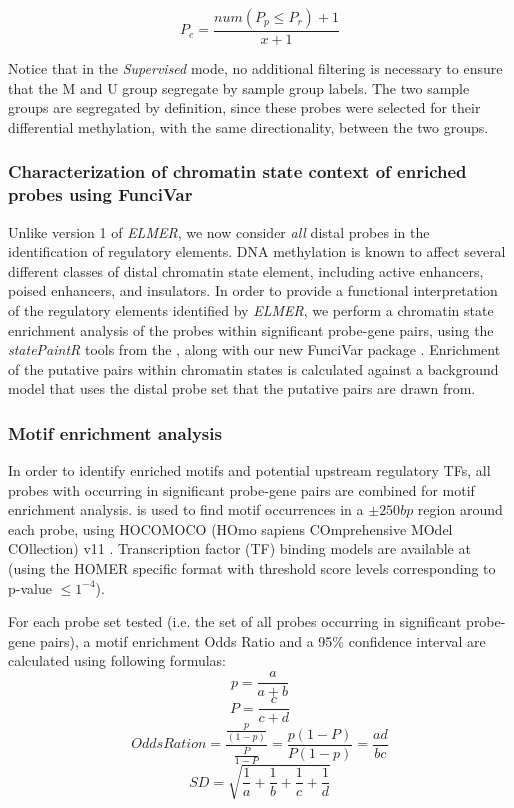 $$P_e = \frac{num(P_p \leq P_r)+ 1}{x+1}$$

Notice that in the \textit{Supervised} mode, no additional filtering is necessary to ensure that the M and U group segregate by sample group labels.  The two sample groups are segregated by definition, since these probes were selected for their differential methylation, with the same directionality, between the two groups. 



\subsubsection*{Characterization of chromatin state context of enriched probes using FunciVar}

Unlike version 1 of \textit{ELMER}, we now consider \textit{all} distal probes in the identification of regulatory elements. DNA methylation is known to affect several different classes of distal chromatin state element, including active enhancers, poised enhancers, and insulators. In order to provide a functional interpretation of the regulatory elements identified by \textit{ELMER}, we perform a chromatin state enrichment analysis of the probes within significant probe-gene pairs, using the \textit{statePaintR} tools from the  \cite{statepaintr}, along with our new FunciVar package \cite{funcivar}. Enrichment of the putative pairs within chromatin states is calculated against a background model that uses the distal probe set that the putative pairs are drawn from. 

\subsubsection*{Motif enrichment analysis}
In order to identify enriched motifs and potential upstream regulatory TFs, all probes with occurring in significant probe-gene pairs are combined for motif enrichment analysis.  \cite{heinz2010simple} is used to find motif occurrences in a $\pm 250bp$ region around each probe, using HOCOMOCO (HOmo sapiens COmprehensive MOdel COllection) v11 \cite{kulakovskiy2016hocomoco}. Transcription factor (TF) binding models are available at  (using the HOMER specific format with threshold score levels corresponding to p-value $ \leq 1^{-4}$). 

For each probe set tested (i.e. the set of all probes occurring in significant probe-gene pairs), a motif enrichment Odds Ratio and a 95\% confidence interval are calculated using following formulas:
$$p = \frac{a}{a + b}$$
$$P = \frac{c}{c + d}$$
$$Odds Ration = \frac{\frac{p}{(1-p)}}{\frac{P}{1-P}}= \frac{p(1-P)}{P(1-p)}=\frac{ad}{bc}$$
$$SD = \sqrt{\frac{1}{a} + \frac{1}{b} + \frac{1}{c} + \frac{1}{d}}$$

